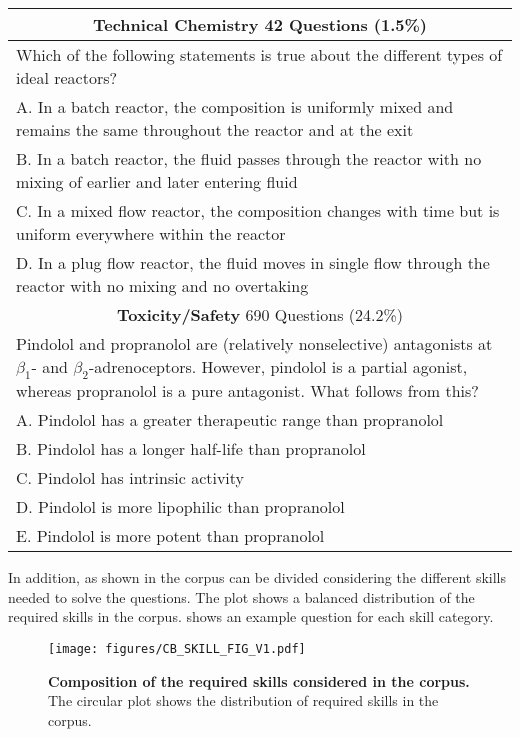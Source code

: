 \begin{table}
{\begin{tabularx}{\textwidth}{X}
            \midrule
            \multicolumn{1}{c}{\textbf{Technical Chemistry} 42 Questions (1.5\%)} \\
            \midrule
            Which of the following statements is true about the different types of ideal reactors? \\
            A. In a batch reactor, the composition is uniformly mixed and remains the same throughout the reactor and at the exit \\
            B. In a batch reactor, the fluid passes through the reactor with no mixing of earlier and later entering fluid \\
            C. In a mixed flow reactor, the composition changes with time but is uniform everywhere within the reactor \\
            D. In a plug flow reactor, the fluid moves in single flow through the reactor with no mixing and no overtaking \\
            \midrule
            \multicolumn{1}{c}{\textbf{Toxicity/Safety} 690 Questions (24.2\%)} \\
            \midrule
            Pindolol and propranolol are (relatively nonselective) antagonists at $\beta_1$- and $\beta_2$-adrenoceptors. However, pindolol is a partial agonist, whereas propranolol is a pure antagonist. What follows from this? \\
            A. Pindolol has a greater therapeutic range than propranolol \\
            B. Pindolol has a longer half-life than propranolol \\
            C. Pindolol has intrinsic activity \\
            D. Pindolol is more lipophilic than propranolol \\
            E. Pindolol is more potent than propranolol \\
            \bottomrule
        \end{tabularx}
    }
 \end{table}

\normalsize

In addition, as shown in  the \chembench corpus can be divided considering the different skills needed to solve the questions. The plot shows a balanced distribution of the required skills in the \chembench corpus.  shows an example question for each skill category.

\begin{figure}
    \centering
    \texttt{[image: figures/CB\_SKILL\_FIG\_V1.pdf]}
    \caption{\textbf{Composition of the required skills considered in the \chembench corpus.} The circular plot shows the distribution of required skills in the \chembench corpus.}
    \label{fig:cb_skillset}
\end{figure}


